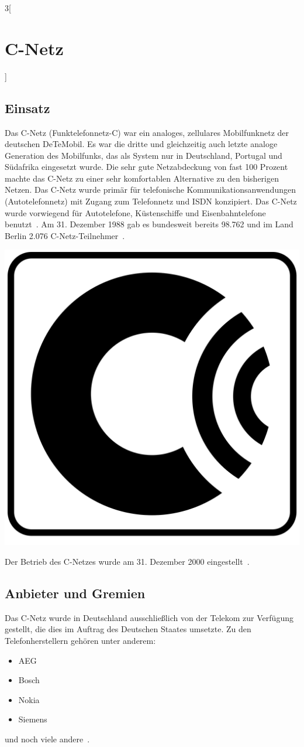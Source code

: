 \begin{multicols}{3}[\section{C-Netz}]
\subsection*{Einsatz}
Das C-Netz (Funktelefonnetz-C) war ein analoges, zellulares Mobilfunknetz der deutschen DeTeMobil. Es war die dritte und gleichzeitig auch letzte analoge Generation des Mobilfunks, das als System nur in Deutschland, Portugal und Südafrika eingesetzt wurde. Die sehr gute Netzabdeckung von fast 100 Prozent machte das C-Netz zu einer sehr komfortablen Alternative zu den bisherigen Netzen. Das C-Netz wurde primär für telefonische Kommunikationsanwendungen (Autotelefonnetz) mit Zugang zum Telefonnetz und ISDN konzipiert. Das C-Netz wurde vorwiegend für Autotelefone, Küstenschiffe und Eisenbahntelefone benutzt~\cite{c-netz.1}.
Am 31. Dezember 1988 gab es bundesweit bereits 98.762 und im Land Berlin 2.076 C-Netz-Teilnehmer~\cite{c-netz.3}.
\begin{Figure}
\includegraphics[width=\linewidth]{Kapitel/C-Netz/Grafiken/C-Netz_Logo.png}
\label{fig:c-netz.logo}
\end{Figure}
Der Betrieb des C-Netzes wurde am 31. Dezember 2000 eingestellt~\cite{c-netz.6}.

\subsection*{Anbieter und Gremien}
Das C-Netz wurde in Deutschland ausschließlich von der Telekom zur Verfügung gestellt, die dies im Auftrag des Deutschen Staates umsetzte. Zu den Telefonherstellern gehören unter anderem: 
\begin{itemize}
	\item AEG
	\item Bosch
	\item Nokia
	\item Siemens
\end{itemize}
und noch viele andere~\cite{c-netz.5}.


\end{multicols}
